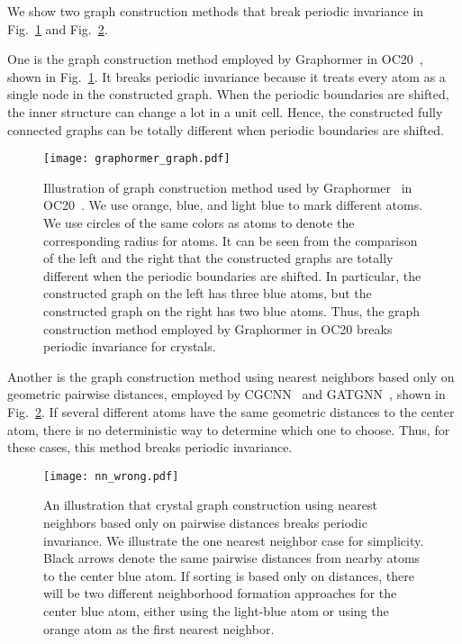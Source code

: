 \documentclass{article}
\begin{document}
We show two graph construction methods that break periodic invariance in Fig.~\ref{fig:graph_graphormer} and Fig.~\ref{fig:nn_wrong}. 

One is the graph construction method employed by Graphormer in OC20~\citep{ocp_dataset}, shown in Fig.~\ref{fig:graph_graphormer}. It breaks periodic invariance because it treats every atom as a single node in the constructed graph. When the periodic boundaries are shifted, the inner structure can change a lot in a unit cell. Hence, the constructed fully connected graphs can be totally different when periodic boundaries are shifted.

\begin{figure}[h]
    \centering
    \texttt{[image: graphormer\_graph.pdf]}
    \caption{
    Illustration of graph construction method used by Graphormer~\citep{graphormer} in OC20~\citep{ocp_dataset}. 
    We use orange, blue, and light blue to mark different atoms. We use circles of the same colors as atoms to denote the corresponding radius for atoms. It can be seen from the comparison of the left and the right that the constructed graphs are totally different when the periodic boundaries are shifted. In particular, the constructed graph on the left has three blue atoms, but the constructed graph on the right has two blue atoms. Thus, the graph construction method employed by Graphormer in OC20 breaks periodic invariance for crystals.
    }
    \label{fig:graph_graphormer}
\end{figure}

Another is the graph construction method using nearest neighbors based only on geometric pairwise distances, employed by CGCNN~\citep{cgcnn} and GATGNN~\citep{gatgnn}, shown in Fig.~\ref{fig:nn_wrong}. If several different atoms have the same geometric distances to the center atom, there is no deterministic way to determine which one to choose. Thus, for these cases, this method breaks periodic invariance.

\begin{figure}[h]
    \centering
    \texttt{[image: nn\_wrong.pdf]}
    \caption{
    An illustration that crystal graph construction using nearest neighbors based only on pairwise distances breaks periodic invariance. We illustrate the one nearest neighbor case for simplicity. Black arrows denote the same pairwise distances from nearby atoms to the center blue atom. If sorting is based only on distances, there will be two different neighborhood formation approaches for the center blue atom, either using the light-blue atom or using the orange atom as the first nearest neighbor.
    }
    \label{fig:nn_wrong}
\end{figure}
\end{document}
